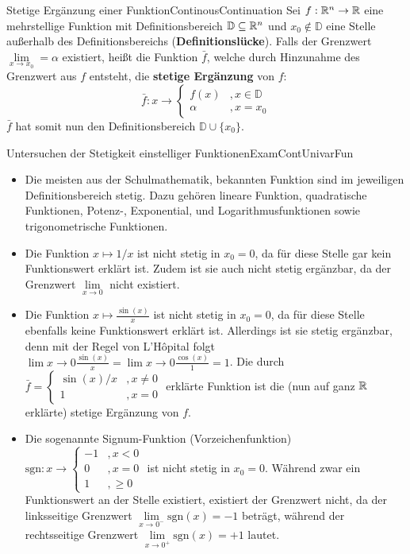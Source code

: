 \begin{definition}{Stetige Ergänzung einer Funktion}{ContinousContinuation}
    Sei $f: \mathbb{R}^n\to\mathbb{R}$ eine mehrstellige Funktion mit Definitionsbereich $\mathbb{D}\subseteq\mathbb{R}^n$ und $x_0\notin\mathbb{D}$ eine Stelle außerhalb des Definitionsbereichs (\textbf{Definitionslücke}). Falls der Grenzwert $\lim\limits_{x\to x_0} = \alpha$ existiert, heißt die Funktion $\bar{f}$, welche durch Hinzunahme des Grenzwert aus $f$ entsteht, die \textbf{stetige Ergänzung} von $f$:
    $$
        \bar{f}: x \to \begin{cases}
            f(x) & , x \in \mathbb{D} \\
            \alpha & , x = x_0
        \end{cases}
    $$
    $\bar{f}$ hat somit nun den Definitionsbereich $\mathbb{D} \cup \lbrace x_0 \rbrace$.
\end{definition}

\begin{example}{Untersuchen der Stetigkeit einstelliger Funktionen}{ExamContUnivarFun}
    \begin{itemize}
        \item Die meisten aus der Schulmathematik, bekannten Funktion sind im jeweiligen Definitionsbereich stetig. Dazu gehören lineare Funktion, quadratische Funktionen, Potenz-, Exponential, und Logarithmusfunktionen sowie trigonometrische Funktionen.
        \item Die Funktion $x\mapsto 1/x$ ist nicht stetig in $x_0=0$, da für diese Stelle gar kein Funktionswert erklärt ist. Zudem ist sie auch nicht stetig ergänzbar, da der Grenzwert $\lim\limits_{x\to 0}$ nicht existiert.
        \item Die Funktion $x \mapsto \frac{\sin(x)}{x}$ ist nicht stetig in $x_0=0$, da für diese Stelle ebenfalls keine Funktionswert erklärt ist. Allerdings ist sie stetig ergänzbar, denn mit der Regel von L'Hôpital folgt $\lim\limits{x\to 0} \frac{\sin(x)}{x} = \lim\limits{x\to 0} \frac{\cos(x)}{1} = 1$. Die durch $\bar{f} = \begin{cases} \sin(x)/x & , x \ne 0 \\ 1 & , x = 0 \end{cases}$ erklärte Funktion ist die (nun auf ganz $\mathbb{R}$ erklärte) stetige Ergänzung von $f$.
        \item Die sogenannte Signum-Funktion (Vorzeichenfunktion) $\text{sgn}: x \to \begin{cases} -1 &, x < 0 \\ 0 &, x = 0 \\ 1 &, \ge 0 \end{cases}$ ist nicht stetig in $x_0=0$. Während zwar ein Funktionswert an der Stelle existiert, existiert der Grenzwert nicht, da der linksseitige Grenzwert $\lim\limits_{x\to 0^-} \text{sgn}(x) = -1$ beträgt, während der rechtsseitige Grenzwert $\lim\limits_{x\to 0^+} \text{sgn}(x) = +1$ lautet.
    \end{itemize}
\end{example}

